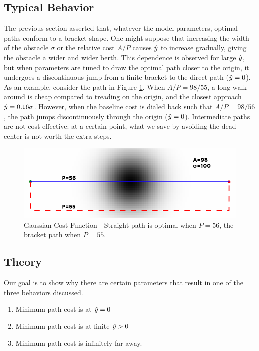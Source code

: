 \subsection{Typical Behavior}

The previous section asserted that, whatever the model parameters, optimal paths conform to a bracket shape. One might suppose that increasing the width of the obstacle $\sigma$ or the relative cost $A/P$ causes $\hat{y}$ to increase gradually, giving the obstacle a wider and wider berth. This dependence is observed for large $\hat{y}$, but when parameters are tuned to draw the optimal path closer to the origin, it undergoes a discontinuous jump from a finite bracket to the direct path ($\hat{y}=0$). As an example, consider the path in Figure \ref{fig:gaussian}. When $A/P=98/55$, a long walk around is cheap compared to treading on the origin, and the closest approach $\hat{y}=0.16\sigma$. However, when the baseline cost is dialed back such that $A/P=98/56$, the path jumps discontinuously through the origin ($\hat{y}=0$). Intermediate paths are not cost-effective: at a certain point, what we save by avoiding the dead center is not worth the extra steps.

\begin{figure}
\includegraphics[width=\columnwidth]{graphix/Gaussian.png}
\caption{Gaussian Cost Function - Straight path is optimal when $P=56$, the bracket path when $P=55$. }
\label{fig:gaussian}
\end{figure}

\subsection{Theory}
Our goal is to show why there are certain parameters that result in one of the three behaviors discussed. 
\begin{enumerate}
\item Minimum path cost is at $\hat{y}=0$
\item Minimum path cost is at finite $\hat{y}>0$
\item Minimum path cost is infinitely far away. 
\end{enumerate}

